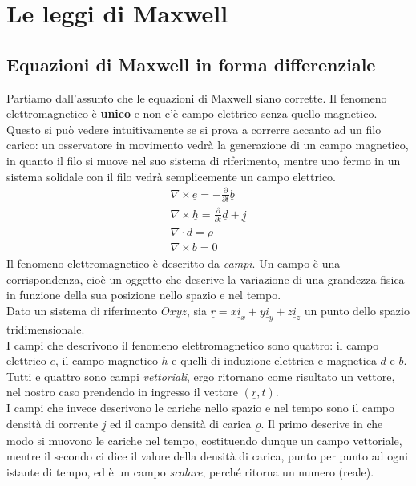 \documentclass{book}
\begin{document}
    \section{Le leggi di Maxwell}
        \subsection{Equazioni di Maxwell in forma differenziale}
        Partiamo dall'assunto che le equazioni di Maxwell siano corrette. Il fenomeno elettromagnetico è \textbf{unico} e non c'è campo elettrico senza quello magnetico. Questo si può vedere intuitivamente se si prova a correrre accanto ad un filo carico: un osservatore in movimento vedrà la generazione di un campo magnetico, in quanto il filo si muove nel suo sistema di riferimento, mentre uno fermo in un sistema solidale con il filo vedrà semplicemente un campo elettrico. \\
        \begin{align}
            \nabla \times \underline{e} = - \displaystyle \frac{\partial }{ \partial t}     \underline{b} \label{eqn:maxwell_rot_e} \\
            \nabla \times \underline{h} = \displaystyle \frac{\partial}{ \partial t} \underline{d}+\underline{j}  \label{eqn:maxwell_rot_h} \\
            \nabla \cdot \underline{d} = \rho  \label{eqn:maxwell_div_d}\\
            \nabla \times \underline{b} = 0 \label{eqn:maxwell_div_b}
        \end{align}
        Il fenomeno elettromagnetico è descritto da \textit{campi}. Un campo è una corrispondenza, cioè un oggetto che descrive la variazione di una grandezza fisica in funzione della sua posizione nello spazio e nel tempo. \\
        Dato un sistema di riferimento $Oxyz$, sia $\underline{r} = x \underline{i}_{x} + y \underline{i}_{y} + z \underline{i}_{z}$ un punto dello spazio tridimensionale.\\
        I campi che descrivono il fenomeno elettromagnetico sono quattro: il campo elettrico $\underline{e}$, il campo  magnetico $\underline{h}$ e quelli di induzione elettrica e magnetica $\underline{d}$ e $\underline{b}$. \\
        Tutti e quattro sono campi \textit{vettoriali}, ergo ritornano come risultato un vettore, nel nostro caso prendendo in ingresso il vettore $(\underline{r}, t)$.\\
        I campi che invece descrivono le cariche nello spazio e nel tempo sono il campo densità di corrente $\underline{j}$ ed il campo densità di carica $\underline{\rho}$. Il primo descrive in che modo si muovono le cariche nel tempo, costituendo dunque un campo vettoriale, mentre il secondo ci dice il valore della densità di carica, punto per punto ad ogni istante di tempo, ed è un campo \textit{scalare}, perché ritorna un numero (reale).\\
\end{document}
